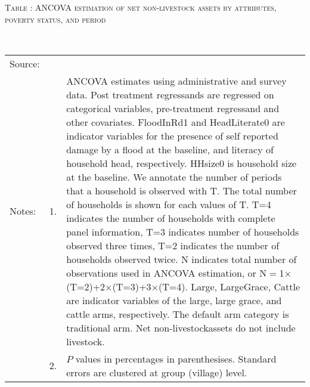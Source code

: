 \hspace{-1cm}\begin{minipage}[t]{14cm}
\hfil\textsc{\normalsize Table \thetable: ANCOVA estimation of net non-livestock assets by attributes, poverty status, and period\label{tab ANCOVA NetNLAssets timevarying poverty status attributes}}\\
\setlength{\tabcolsep}{1pt}
\setlength{\baselineskip}{8pt}
\renewcommand{\arraystretch}{.55}
\hfil{}\\
\renewcommand{\arraystretch}{.8}
\setlength{\tabcolsep}{1pt}
\begin{tabular}{>{\hfill\scriptsize}p{1cm}<{}>{\hfill\scriptsize}p{.25cm}<{}>{\scriptsize}p{12cm}<{\hfill}}
Source:& \multicolumn{2}{l}{\scriptsize Estimated with GUK administrative and survey data.}\\
Notes: & 1. & ANCOVA estimates using administrative and survey data. Post treatment regressands are regressed on categorical variables, pre-treatment regressand and other covariates. \textsf{FloodInRd1} and \textsf{HeadLiterate0} are indicator variables for the presence of self reported damage by a flood at the baseline, and literacy of household head, respectively. \textsf{HHsize0} is household size at the baseline. We annotate the number of periods that a household is observed with \textsf{T}. The total number of households is shown for each values of \textsf{T}. \textsf{T=4} indicates the number of households with complete panel information, \textsf{T=3} indicates number of households observed three times, \textsf{T=2} indicates the number of households observed twice. \textsf{N} indicates total number of observations used in ANCOVA estimation, or \textsf{N$=$1$\times$(T=2)+2$\times$(T=3)+3$\times$(T=4)}.  \textsf{Large}, \textsf{LargeGrace}, \textsf{Cattle} are indicator variables of the \textsf{large}, \textsf{large grace}, and \textsf{cattle} arms, respectively. The default arm category is \textsf{traditional} arm. Net non-livestockassets do not include livestock. \\
& 2. & $P$ values in percentages in parenthesises. Standard errors are clustered at group (village) level.
\end{tabular}
\end{minipage}


